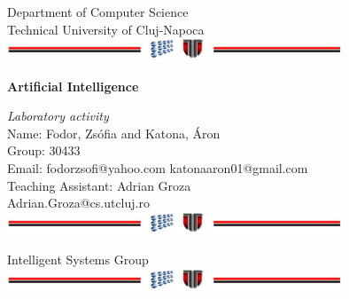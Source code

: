 \documentclass[a4paper,12pt]{report}
\begin{document}
\vspace{-5cm}
\begin{center}
Department of Computer Science\\
Technical University of Cluj-Napoca\\
\includegraphics[width=10cm]{fig/footer}
\end{center}
\vspace{1cm}
\begin{center}
\begin{Large}
 \textbf{Artificial Intelligence}\\
\end{Large}
\textit{Laboratory activity}\\
\vspace{3cm}
Name: Fodor, Zsófia and Katona, Áron\\
Group: 30433\\
Email: fodorzsofi@yahoo.com katonaaron01@gmail.com\\
\vspace{12cm}
Teaching Assistant: Adrian Groza\\
Adrian.Groza@cs.utcluj.ro\\
\vspace{1cm}
\includegraphics[width=10cm]{fig/footer}
\end{center}

\tableofcontents








\appendix




\vspace{2cm}
\begin{center}
Intelligent Systems Group\\
\includegraphics[width=10cm]{fig/footer}
\end{center}
\end{document}
